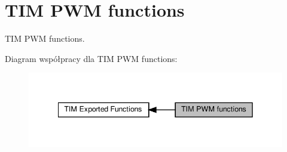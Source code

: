 \hypertarget{group___t_i_m___exported___functions___group3}{}\section{T\+IM P\+WM functions}
\label{group___t_i_m___exported___functions___group3}


T\+IM P\+WM functions.  


Diagram współpracy dla T\+IM P\+WM functions\+:\nopagebreak
\begin{figure}[H]
\begin{center}
\leavevmode
\includegraphics[width=342pt]{group___t_i_m___exported___functions___group3}
\end{center}
\end{figure}
